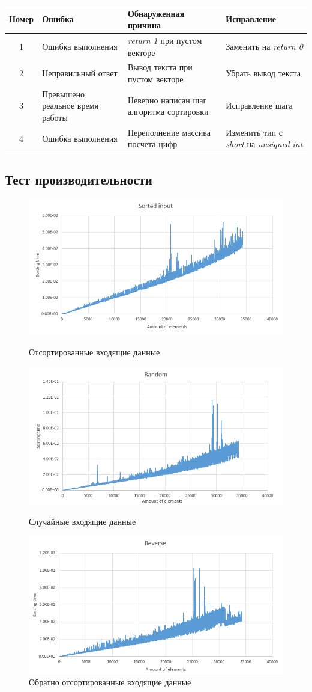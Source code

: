\documentclass[12pt]{article}
\begin{document}
\begin{center}
 \begin{tabular}{| c |p{4cm}|p{5cm}|p{4cm}|} 
 \hline
 Номер & Ошибка & Обнаруженная причина &  Исправление \\
 \hline\hline
 1 & Ошибка выполнения & \textit{return 1} при пустом векторе & Заменить на \textit{return 0}  \\ 
 \hline
 2 & Неправильный ответ & Вывод текста при пустом векторе & Убрать вывод текста \\
 \hline
 3 & Превышено реальное время работы & Неверно написан шаг алгоритма сортировки & Исправление шага \\
 \hline
 4 & Ошибка выполнения & Переполнение массива посчета цифр & Изменить тип с \textit{short} на \textit{unsigned int} \\ 
 \hline
\end{tabular}
\end{center}

\subsection*{Тест производительности}

\begin{figure}[htp]

\centering
\includegraphics[width=.7\textwidth]{pics/sorted.png}\hfill
\caption{Отсортированные входящие данные}
\includegraphics[width=.7\textwidth]{pics/random.png}\hfill
\caption{Случайные входящие данные}
\includegraphics[width=.7\textwidth]{pics/reverse.png}
\caption{Обратно отсортированные входящие данные}
\label{fig:figure3}

\end{figure}
\end{document}
